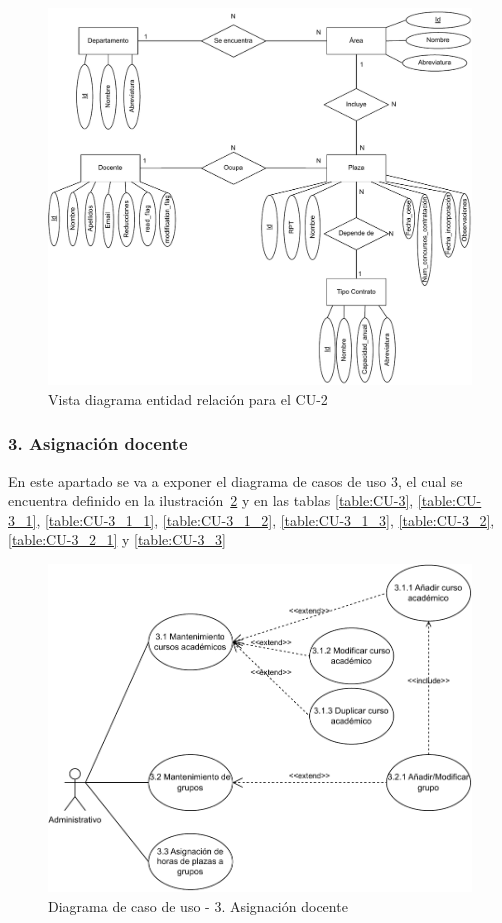 \begin{figure}[!h]
	\centering
	\includegraphics[scale=0.68]{../img/Anexos/Casos uso/Vistas ER/Diagrama E-R CU 2.pdf}
	\caption{Vista diagrama entidad relación para el CU-2}\label{er_cu2}
\end{figure}
\FloatBarrier

\newpage
\subsubsection{3. Asignación docente}

En este apartado se va a exponer el diagrama de casos de uso 3, el cual se encuentra definido en la ilustración~\ref{fig:CU-3} y en las tablas \ref{table:CU-3}, \ref{table:CU-3_1}, \ref{table:CU-3_1_1}, \ref{table:CU-3_1_2}, \ref{table:CU-3_1_3}, \ref{table:CU-3_2}, \ref{table:CU-3_2_1} y \ref{table:CU-3_3}

\begin{figure}[!h]
	\centering
	\includegraphics[scale=0.9]{../img/Anexos/Casos uso/Diagrama casos de uso 4.pdf}
	\caption{Diagrama de caso de uso - 3. Asignación docente}\label{fig:CU-3}
\end{figure}
\FloatBarrier

